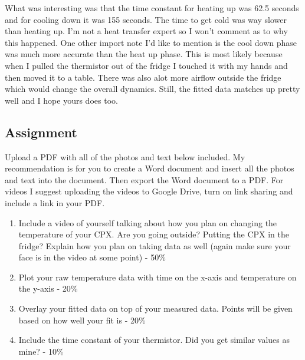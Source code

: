 What was interesting was that the time constant for heating up was 62.5 seconds and for cooling down it was 155 seconds. The time to get cold was way slower than heating up. I’m not a heat transfer expert so I won’t comment as to why this happened. One other import note I’d like to mention is the cool down phase was much more accurate than the heat up phase. This is most likely because when I pulled the thermistor out of the fridge I touched it with my hands and then moved it to a table. There was also alot more airflow outside the fridge which would change the overall dynamics. Still, the fitted data matches up pretty well and I hope yours does too.

\subsection{Assignment}

Upload a PDF with all of the photos and text below included. My recommendation is for you to create a Word document and insert all the photos and text into the document. Then export the Word document to a PDF. For videos I suggest uploading the videos to Google Drive, turn on link sharing and include a link in your PDF.
\begin{enumerate}
\item Include a video of yourself talking about how you plan on changing the temperature of your CPX. Are you going outside? Putting the CPX in the fridge? Explain how you plan on taking data as well (again make sure your face is in the video at some point) - 50\%
\item Plot your raw temperature data with time on the x-axis and temperature on the y-axis - 20\%
\item Overlay your fitted data on top of your measured data. Points will be given based on how well your fit is - 20\%
\item Include the time constant of your thermistor. Did you get similar values as mine? - 10\%
\end{enumerate}